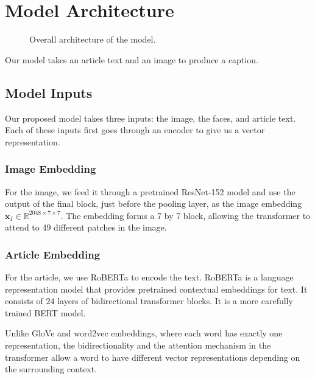 

\section{Model Architecture}

\begin{figure*}[t]
   \begin{center}
   \fbox{\rule{0pt}{2in} \rule{.9\linewidth}{0pt}}
   \end{center}
      \caption{Overall architecture of the model.}
   \label{fig:short}
\end{figure*}

Our model takes an article text and an image to produce a caption.

\subsection{Model Inputs}

Our proposed model takes three inputs: the image, the faces, and article text.
Each of these inputs first goes through an encoder to give us a vector
representation.

\subsubsection{Image Embedding}

For the image, we feed it through a pretrained ResNet-152 model
\cite{He2016ResNet} and use the output of the final block, just before the
pooling layer, as the image embedding $\bm{x}_I \in \mathbb{R}^{2048 \times 7
\times 7}$. The embedding forms a 7 by 7 block, allowing the transformer to
attend to 49 different patches in the image.

\subsubsection{Article Embedding}

For the article, we use RoBERTa \cite{Liu2019RoBERTaAR} to encode the text.
RoBERTa is a language representation model that provides pretrained contextual
embeddings for text. It consists of 24 layers of bidirectional transformer
blocks. It is a more carefully trained BERT \cite{Devlin2019BERT} model.

Unlike GloVe \cite{Pennington2014Glove} and word2vec
\cite{Mikolov2013DistributedRO} embeddings, where each word has exactly one
representation, the bidirectionality and the attention mechanism in the
transformer allow a word to have different vector representations depending on
the surrounding context.

